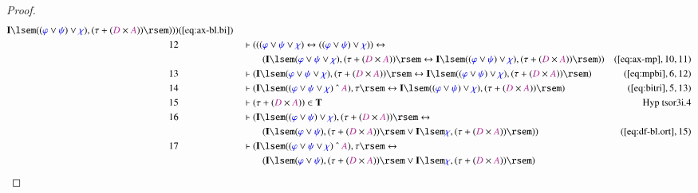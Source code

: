 \begin{proof}
\begin{align}
     \mathbf{I} \lsem ( ( \mw{\varphi}
      \vee \mw{\psi} ) \vee \mw{\chi} ) , ( \tau + ( \mc{D}
      \times \mc{A} ) ) \rsem ) )
      )&(\mbox{\ref{eq:ax-bl.bi}})\notag
  \\ 12 &&  & \vdash ( ( ( \mw{\varphi} \vee \mw{\psi} \vee \mw{\chi} )
      \leftrightarrow ( ( \mw{\varphi} \vee \mw{\psi} )
      \vee \mw{\chi} ) ) \leftrightarrow  \notag \\ & & & \qquad
     ( \mathbf{I} \lsem
      ( \mw{\varphi} \vee \mw{\psi} \vee \mw{\chi} ) , (
      \tau + ( \mc{D} \times \mc{A} ) ) \rsem
      \leftrightarrow \mathbf{I} \lsem ( ( \mw{\varphi}
      \vee \mw{\psi} ) \vee \mw{\chi} ) , ( \tau + ( \mc{D}
      \times \mc{A} ) ) \rsem )
      )&(\mbox{\ref{eq:ax-mp}},10,11)\notag
  \\ 13 &&  & \vdash ( \mathbf{I} \lsem ( \mw{\varphi} \vee \mw{\psi} \vee
      \mw{\chi} ) , ( \tau + ( \mc{D} \times \mc{A} ) )
      \rsem \leftrightarrow \mathbf{I} \lsem ( (
      \mw{\varphi} \vee \mw{\psi} ) \vee \mw{\chi} ) , (
      \tau + ( \mc{D} \times \mc{A} ) ) \rsem
      )&(\mbox{\ref{eq:mpbi}},6,12)\notag
  \\ 14 &&  & \vdash ( \mathbf{I} \lsem ( ( \mw{\varphi} \vee \mw{\psi} \vee
      \mw{\chi} ) ~\string^~ \mc{A} ) , \tau \rsem
      \leftrightarrow \mathbf{I} \lsem ( ( \mw{\varphi}
      \vee \mw{\psi} ) \vee \mw{\chi} ) , ( \tau + ( \mc{D}
      \times \mc{A} ) ) \rsem
      )&(\mbox{\ref{eq:bitri}},5,13)\notag
  \\ 15 &&  & \vdash ( \tau + ( \mc{D} \times \mc{A} ) ) \in
      \mathbf{T}&\text{Hyp~tsor3i.4}\notag%
  \\ 16 &&  & \vdash ( \mathbf{I} \lsem ( ( \mw{\varphi} \vee \mw{\psi} ) \vee
      \mw{\chi} ) , ( \tau + ( \mc{D} \times \mc{A} ) )
      \rsem \leftrightarrow  \notag \\ & & & \qquad
     ( \mathbf{I} \lsem (
      \mw{\varphi} \vee \mw{\psi} ) , ( \tau + ( \mc{D}
      \times \mc{A} ) ) \rsem \vee \mathbf{I} \lsem
      \mw{\chi} , ( \tau + ( \mc{D} \times \mc{A} ) ) \rsem
      ) )&(\mbox{\ref{eq:df-bl.ort}},15)\notag
  \\ 17 &&  & \vdash ( \mathbf{I} \lsem ( ( \mw{\varphi} \vee \mw{\psi} \vee
      \mw{\chi} ) ~\string^~ \mc{A} ) , \tau \rsem
      \leftrightarrow  \notag \\ & & & \qquad
     ( \mathbf{I} \lsem ( \mw{\varphi}
      \vee \mw{\psi} ) , ( \tau + ( \mc{D} \times \mc{A} ) )
      \rsem \vee \mathbf{I} \lsem \mw{\chi} , ( \tau + (
      \mc{D} \times \mc{A} ) ) \rsem )

\end{align}
\end{proof}

